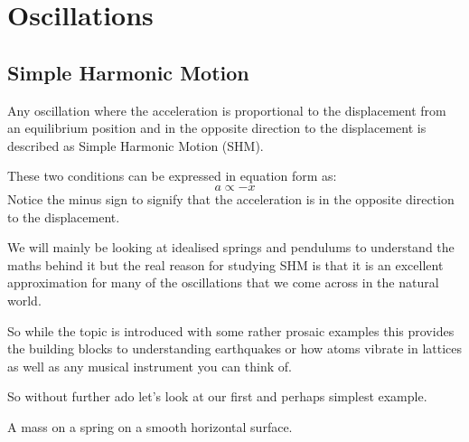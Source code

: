 \documentclass[revision-guide.tex]{subfiles}
\begin{document}
\chapter{Oscillations}
\section{Simple Harmonic Motion}


Any oscillation where the acceleration is proportional to the displacement from an equilibrium position and in the opposite direction to the displacement is described as Simple Harmonic Motion (SHM).

These two conditions can be expressed in equation form as:
\[ a \propto -x \]
Notice the minus sign to signify that the acceleration is in the opposite direction to the displacement.

We will mainly be looking at idealised springs and pendulums to understand the maths behind it but the real reason for studying SHM is that it is an excellent approximation for many of the oscillations that we come across in the natural world.

So while the topic is introduced with some rather prosaic examples this provides the building blocks to understanding earthquakes or how atoms vibrate in lattices as well as any musical instrument you can think of.


So without further ado let's look at our first and perhaps simplest example.

A mass on a spring on a smooth horizontal surface.
\vspace{0.2in}


\end{document}
